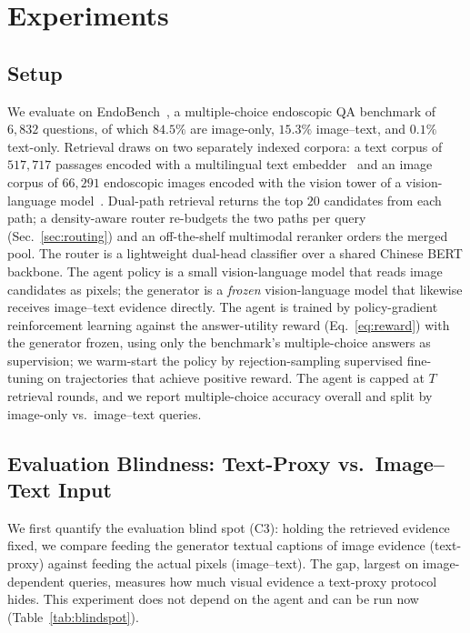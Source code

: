 \section{Experiments}
\label{sec:experiments}

\subsection{Setup}
\label{sec:setup}
We evaluate on EndoBench~\cite{endobench}, a multiple-choice endoscopic QA
benchmark of $6{,}832$ questions, of which $84.5\%$ are image-only, $15.3\%$
image--text, and $0.1\%$ text-only. Retrieval draws on two separately indexed
corpora: a text corpus of $517{,}717$ passages encoded with a multilingual
text embedder~\cite{chen2024bgem3} and an image corpus of $66{,}291$ endoscopic
images encoded with the vision tower of a vision-language
model~\cite{bai2023qwenvl}. Dual-path retrieval returns the top $20$ candidates
from each path; a density-aware router re-budgets the two paths per query
(Sec.~\ref{sec:routing}) and an off-the-shelf multimodal reranker orders the
merged pool. The router is a lightweight dual-head classifier over a shared
Chinese BERT backbone. The agent policy is a small vision-language model that
reads image candidates as pixels; the generator is a \emph{frozen}
vision-language model that likewise receives image--text evidence directly. The
agent is trained by policy-gradient reinforcement learning against the
answer-utility reward (Eq.~\ref{eq:reward}) with the generator frozen, using only
the benchmark's multiple-choice answers as supervision; we warm-start the policy
by rejection-sampling supervised fine-tuning on trajectories that achieve
positive reward. The agent is capped at $T$ retrieval rounds, and we report
multiple-choice accuracy overall and split by image-only vs.\ image--text
queries.

\subsection{Evaluation Blindness: Text-Proxy vs.\ Image--Text Input}
\label{sec:blindspot}
We first quantify the evaluation blind spot (C3): holding the retrieved evidence
fixed, we compare feeding the generator textual captions of image evidence
(text-proxy) against feeding the actual pixels (image--text). The gap, largest on
image-dependent queries, measures how much visual evidence a text-proxy protocol
hides. This experiment does not depend on the agent and can be run now
(Table~\ref{tab:blindspot}).

